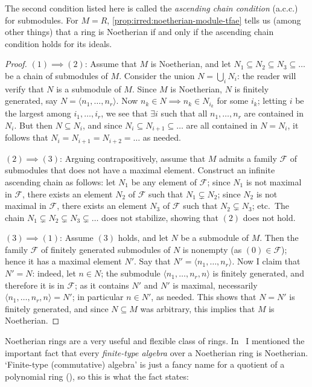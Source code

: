 The second condition listed here is called the \emph{ascending chain
  condition} (a.c.c.) for submodules. For $M = R$,
\cref{prop:irred:noetherian-module-tfae} tells us (among other things) that a ring is
Noetherian if and only if the ascending chain condition holds for its
ideals.
\begin{proof}
  $(1) \implies (2)$: Assume that $M$ is Noetherian, and let
  $N_1 \subseteq N_2 \subseteq N_3 \subseteq \dots$ be a chain of
  submodules of $M$. Consider the union $N = \bigcup_i N_i$: the
  reader will verify that $N$ is a submodule of $M$. Since $M$ is
  Noetherian, $N$ is finitely generated, say
  $N = \langle n_1, \dots, n_r \rangle$. Now
  $n_k \in N \implies n_k \in N_{i_k}$ for some $i_k$; letting $i$ be
  the largest among $i_1, \dots, i_r$, we see that $\exists i$ such
  that all $n_1, \dots, n_r$ are contained in $N_i$. But then
  $N \subseteq N_i$, and since $N_i \subseteq N_{i+1} \subseteq \dots$
  are all contained in $N = N_i$, it follows that
  $N_i = N_{i+1} = N_{i+2} = \dots$ as needed.

  $(2) \implies (3)$: Arguing contrapositively, assume that $M$ admits
  a family $\mathscr{F}$ of submodules that does not have a maximal
  element.  Construct an infinite ascending chain as follows: let
  $N_1$ be any element of $\mathscr{F}$; since $N_1$ is not maximal in
  $\mathscr{F}$, there exists an element $N_2$ of $\mathscr{F}$ such
  that $N_1 \subsetneq N_2$; since $N_2$ is not maximal in
  $\mathscr{F}$, there exists an element $N_3$ of $\mathscr{F}$ such
  that $N_2 \subsetneq N_3$; etc.\ The chain
  $N_1 \subsetneq N_2 \subsetneq N_3 \subsetneq \dots$ does not
  stabilize, showing that $(2)$ does not hold.

  $(3) \implies (1)$: Assume $(3)$ holds, and let $N$ be a submodule
  of $M$.  Then the family $\mathscr{F}$ of finitely generated
  submodules of $N$ is nonempty (as $(0) \in \mathscr{F}$); hence it
  has a maximal element $N'$.  Say that
  $N' = \langle n_1, \dots, n_r \rangle$. Now I claim that $N' = N$:
  indeed, let $n \in N$; the submodule
  $\langle n_1, \dots, n_r, n \rangle$ is finitely generated, and
  therefore it is in $\mathscr{F}$; as it contains $N'$ and $N'$ is
  maximal, necessarily $\langle n_1, \dots, n_r, n \rangle = N'$; in
  particular $n \in N'$, as needed. This shows that $N = N'$ is
  finitely generated, and since $N \subseteq M$ was arbitrary, this
  implies that $M$ is Noetherian.
\end{proof}
Noetherian rings are a very useful and flexible class of
rings. In~ I
mentioned the important fact that every \emph{finite-type algebra}
over a Noetherian ring is Noetherian. `Finite-type (commutative)
algebra' is just a fancy name for a quotient of a polynomial ring
(), so this is
what the fact states:

